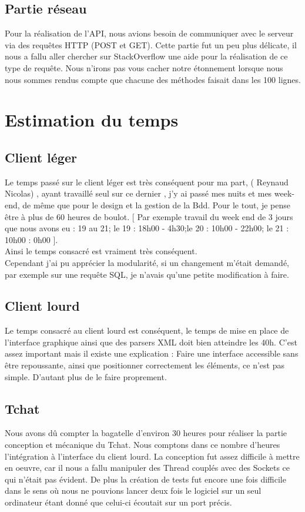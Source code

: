 \documentclass{article}
\begin{document}
\subsection{Partie réseau}
Pour la réalisation de l'API, nous avions besoin de communiquer avec le serveur via des requêtes HTTP (POST et GET). Cette partie fut un peu plus délicate, il nous a fallu aller chercher sur StackOverflow une aide pour la réalisation de ce type de requête. Nous n'irons pas vous cacher notre étonnement lorsque nous nous sommes rendus compte que chacune des méthodes faisait dans les 100 lignes. 


\section{Estimation du temps}
\subsection{Client léger}
Le temps passé sur le client léger est très conséquent pour ma part, ( Reynaud Nicolas) , ayant travaillé seul sur ce dernier , j'y ai passé mes nuits et mes week-end, de même que pour le design et la gestion de la Bdd.
Pour le tout, je pense être à plus de 60 heures de boulot. [ Par exemple travail du week end de 3 jours que nous avons eu :  19 au 21;
le 19 : 18h00 - 4h30;le 20 : 10h00 - 22h00; le 21 : 10h00 : 0h00 ].\\
Ainsi le temps consacré est vraiment très conséquent.\\
Cependant j'ai pu apprécier la modularité, si un changement m'était demandé, par exemple sur une requête SQL, je n'avais qu'une petite modification à faire.

\subsection{Client lourd}
Le temps consacré au client lourd est conséquent, le temps de mise en place de l'interface graphique ainsi que des parsers XML doit bien atteindre les 40h.
C'est assez important mais il existe une explication : Faire une interface accessible sans être repoussante, ainsi que positionner
correctement les éléments, ce n'est pas simple. D'autant plus de le faire proprement.
 
\subsection{Tchat}
Nous avons dû compter la bagatelle d'environ 30 heures pour réaliser la partie conception et mécanique du Tchat. Nous comptons dans ce nombre d'heures l'intégration à l'interface du client lourd.
La conception fut assez difficile à mettre en oeuvre, car il nous a fallu manipuler des Thread couplés avec des Sockets ce qui n'était pas évident. De plus la création de tests fut encore une fois difficile dans le sens où nous ne pouvions lancer deux fois le logiciel sur un seul ordinateur étant donné que celui-ci écoutait sur un port précis. 
\end{document}
